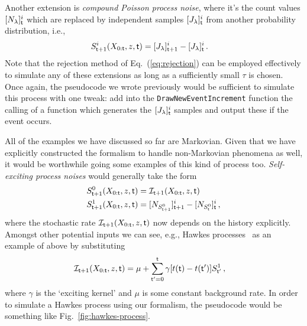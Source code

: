 Another extension is \emph{compound Poisson process noise}, where it's the count values $[N_{\lambda}]^i_{\sf t}$ which are replaced by independent samples $[J_{\lambda}]^i_{\sf t}$ from another probability distribution, i.e.,
\begin{align}
S^{i}_{{\sf t}+1}(X_{0:{\sf t}},z,{\sf t}) &= [J_{\lambda}]^i_{{\sf t}+1}-[J_{\lambda}]^i_{\sf t}\,.
\end{align}
Note that the rejection method of Eq.~(\ref{eq:rejection}) can be employed effectively to simulate any of these extensions as long as a sufficiently small $\tau$ is chosen. Once again, the pseudocode we wrote previously would be sufficient to simulate this process with one tweak: add into the \texttt{DrawNewEventIncrement} function the calling of a function which generates the $[J_{\lambda}]^i_{\sf t}$ samples and output these if the event occurs.

All of the examples we have discussed so far are Markovian. Given that we have explicitly constructed the formalism to handle non-Markovian phenomena as well, it would be worthwhile going some examples of this kind of process too. \emph{Self-exciting process noises} would generally take the form
\begin{align}
S^{0}_{{\sf t}+1}(X_{0:{\sf t}},z,{\sf t}) &= {\cal I}_{{\sf t}+1} (X_{0:{\sf t}},z,{\sf t}) \\
S^{1}_{{\sf t}+1}(X_{0:{\sf t}},z,{\sf t}) &= [N_{S^{0}_{{\sf t}+1}}]^i_{{\sf t}+1}-[N_{S^{0}_{{\sf t}}}]^i_{\sf t} \,,
\end{align}
where the stochastic rate ${\cal I}_{{\sf t}+1} (X_{0:{\sf t}},z,{\sf t})$ now depends on the history explicitly. Amongst other potential inputs we can see, e.g., Hawkes processes~\cite{hawkes1971spectra} as an example of above by substituting 
\begin{align}
{\cal I}_{{\sf t}+1} (X_{0:{\sf t}},z,{\sf t}) &= \mu + \sum^{{\sf t}}_{{\sf t}'=0}\gamma [t({\sf t})-t({\sf t}')]S^{1}_{{\sf t}'} \,,
\end{align}
where $\gamma$ is the `exciting kernel' and $\mu$ is some constant background rate. In order to simulate a Hawkes process using our formalism, the pseudocode would be something like Fig.~\ref{fig:hawkes-process}.

